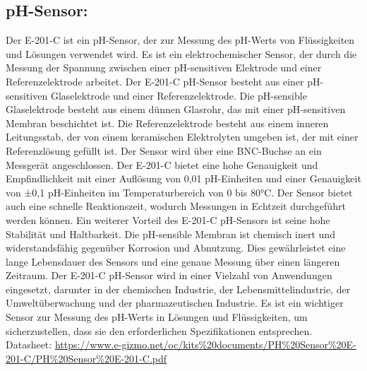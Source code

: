 \subsection*{pH-Sensor:}
Der E-201-C ist ein pH-Sensor, der zur Messung des pH-Werts von Flüssigkeiten und Lösungen verwendet wird. Es ist ein elektrochemischer Sensor, der durch die Messung der Spannung zwischen einer pH-sensitiven Elektrode und einer Referenzelektrode arbeitet.
Der E-201-C pH-Sensor besteht aus einer pH-sensitiven Glaselektrode und einer Referenzelektrode. Die pH-sensible Glaselektrode besteht aus einem dünnen Glasrohr, das mit einer pH-sensitiven Membran beschichtet ist. Die Referenzelektrode besteht aus einem inneren Leitungsstab, der von einem keramischen Elektrolyten umgeben ist, der mit einer Referenzlösung gefüllt ist. Der Sensor wird über eine BNC-Buchse an ein Messgerät angeschlossen.
Der E-201-C bietet eine hohe Genauigkeit und Empfindlichkeit mit einer Auflösung von 0,01 pH-Einheiten und einer Genauigkeit von ±0,1 pH-Einheiten im Temperaturbereich von 0 bis 80°C. Der Sensor bietet auch eine schnelle Reaktionszeit, wodurch Messungen in Echtzeit durchgeführt werden können.
Ein weiterer Vorteil des E-201-C pH-Sensors ist seine hohe Stabilität und Haltbarkeit. Die pH-sensible Membran ist chemisch inert und widerstandsfähig gegenüber Korrosion und Abnutzung. Dies gewährleistet eine lange Lebensdauer des Sensors und eine genaue Messung über einen längeren Zeitraum.
Der E-201-C pH-Sensor wird in einer Vielzahl von Anwendungen eingesetzt, darunter in der chemischen Industrie, der Lebensmittelindustrie, der Umweltüberwachung und der pharmazeutischen Industrie. Es ist ein wichtiger Sensor zur Messung des pH-Werts in Lösungen und Flüssigkeiten, um sicherzustellen, dass sie den erforderlichen Spezifikationen entsprechen. 
\newline
Datasheet: \url{https://www.e-gizmo.net/oc/kits%20documents/PH%20Sensor%20E-201-C/PH%20Sensor%20E-201-C.pdf}

\newpage
